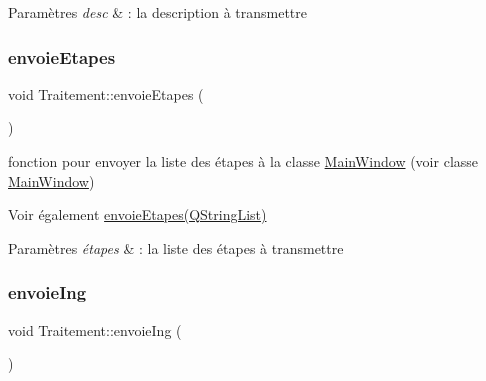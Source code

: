 \begin{DoxyParams}{Paramètres}
{\em desc} & \+: la description à transmettre \\
\hline
\end{DoxyParams}
\mbox{\label{classTraitement_ae58a2b32e2632bfc11a696c186ace3b7}} 
\subsubsection{\texorpdfstring{envoie\+Etapes}{envoieEtapes}}
{\footnotesize\ttfamily void Traitement\+::envoie\+Etapes (\begin{DoxyParamCaption}\item[{Q\+String\+List}]{ }\end{DoxyParamCaption})\hspace{0.3cm}{\ttfamily [signal]}}



fonction pour envoyer la liste des étapes à la classe \hyperlink{classMainWindow}{Main\+Window} (voir classe \hyperlink{classMainWindow}{Main\+Window}) 

\begin{DoxySeeAlso}{Voir également}
\hyperlink{classTraitement_ae58a2b32e2632bfc11a696c186ace3b7}{envoie\+Etapes(\+Q\+String\+List)} 
\end{DoxySeeAlso}

\begin{DoxyParams}{Paramètres}
{\em étapes} & \+: la liste des étapes à transmettre \\
\hline
\end{DoxyParams}
\mbox{\label{classTraitement_a8db23635eb895875b0f60acece723df4}} 
\subsubsection{\texorpdfstring{envoie\+Ing}{envoieIng}}
{\footnotesize\ttfamily void Traitement\+::envoie\+Ing (\begin{DoxyParamCaption}\item[{Q\+String\+List}]{ }\end{DoxyParamCaption})\hspace{0.3cm}{\ttfamily [signal]}}



